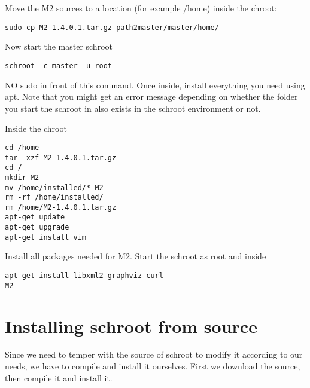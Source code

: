 \documentclass[a4paper]{book}
\begin{document}
Move the M2 sources to a location (for example /home) inside the chroot:

\begin{verbatim}
sudo cp M2-1.4.0.1.tar.gz path2master/master/home/
\end{verbatim}

Now start the master schroot

\begin{verbatim}
schroot -c master -u root
\end{verbatim}

NO sudo in front of this command. Once inside, install everything you need
using apt.  Note that you might get an error message depending on whether the
folder you start the schroot in also exists in the schroot environment or not.

Inside the chroot

\begin{verbatim}
cd /home
tar -xzf M2-1.4.0.1.tar.gz
cd /
mkdir M2
mv /home/installed/* M2
rm -rf /home/installed/
rm /home/M2-1.4.0.1.tar.gz
apt-get update
apt-get upgrade
apt-get install vim
\end{verbatim}

Install all packages needed for M2. Start the schroot as root and inside

\begin{verbatim}
apt-get install libxml2 graphviz curl
M2
\end{verbatim}

\chapter{Installing schroot from source}
Since we need to temper with the source of schroot to modify it according to our needs, we have to compile and install it ourselves. First we download the source, then compile it and install it.
\end{document}
